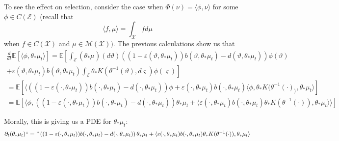 \documentclass[11pt]{amsart}
\theoremstyle{remark}
\theoremstyle{definition}
\begin{document}
To see the effect on selection, consider the case when $\Phi(\nu) = \langle \phi, \nu \rangle$ for some $\phi \in C(\mathcal{E})$ (recall that
\[
	\langle f, \mu \rangle = \int_{\mathcal{X}} f d\mu
\]
when $f \in C(\mathcal{X})$ and $\mu \in \mathcal{M}(\mathcal{X}))$.  The previous calculations show us that 
\begin{multline*}
	\frac{d}{dt} \mathbb{E}[\langle \phi, \theta_{*}\mu_{t} \rangle] 
	= \mathbb{E}\left[\int_{\mathcal{E}} (\theta_{*}\mu_{})(d\vartheta) 
	\left((1-\varepsilon(\vartheta,\theta_{*}\mu_{t})) b(\vartheta,\theta_{*}\mu_{t})- d(\vartheta,\theta_{*}\mu_{t})\right)\phi(\vartheta)\right.\\
	\left.+ \varepsilon(\vartheta,\theta_{*}\mu_{t}) b(\vartheta,\theta_{*}\mu_{t})
		\int_{\mathcal{E}} \theta_{*}K(\theta^{-1}(\vartheta),d\varsigma)\phi(\varsigma)\right]\\
	= \mathbb{E}\left[\langle \left((1-\varepsilon(\cdot,\theta_{*}\mu_{t})) b(\cdot,\theta_{*}\mu_{t})
		- d(\cdot,\theta_{*}\mu_{t})\right)\phi 
		+ \varepsilon(\cdot,\theta_{*}\mu_{t}) b(\cdot,\theta_{*}\mu_{t})\langle \phi, \theta_{*}K(\theta^{-1}(\cdot)_\rangle, \theta_{*}\mu_{t} \rangle 
		\right] \\
	= \mathbb{E}\left[\langle \phi, \left((1-\varepsilon(\cdot,\theta_{*}\mu_{t})) b(\cdot,\theta_{*}\mu_{t})
		- d(\cdot,\theta_{*}\mu_{t}) \right) \theta_{*}\mu_{t}
		+ \langle  \varepsilon(\cdot,\theta_{*}\mu_{t}) b(\cdot,\theta_{*}\mu_{t}) \theta_{*}K(\theta^{-1}(\cdot)),\theta_{*}\mu_{t}\rangle \rangle\right]
\end{multline*}

Morally, this is giving us a PDE for $\theta_{*}\mu_{t}$:
\[
	\partial_{t} (\theta_{*}\mu_{t}) ``=\text{''} \left((1-\varepsilon(\cdot,\theta_{*}\mu_{t})) b(\cdot,\theta_{*}\mu_{t})
		- d(\cdot,\theta_{*}\mu_{t}) \right) \theta_{*}\mu_{t}
		+ \langle  \varepsilon(\cdot,\theta_{*}\mu_{t}) b(\cdot,\theta_{*}\mu_{t}) \theta_{*}K(\theta^{-1}(\cdot)),\theta_{*}\mu_{t}\rangle
\]



\end{document}
